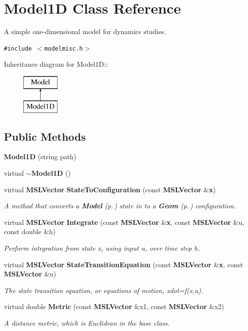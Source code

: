 \section{Model1D  Class Reference}
\label{classModel1D}
A simple one-dimensional model for dynamics studies. 


{\tt \#include $<$modelmisc.h$>$}

Inheritance diagram for Model1D::\begin{figure}[H]
\begin{center}
\leavevmode
\includegraphics[height=2cm]{classModel1D}
\end{center}
\end{figure}
\subsection*{Public Methods}
\begin{CompactItemize}
\item 
{\bf Model1D} (string path)
\item 
virtual {\bf $\sim$Model1D} ()
\item 
virtual {\bf MSLVector} {\bf State\-To\-Configuration} (const {\bf MSLVector} \&{\bf x})
\begin{CompactList}\small\item\em A method that converts a {\bf Model} {\rm (p.\,\pageref{classModel})} state in to a {\bf Geom} {\rm (p.\,\pageref{classGeom})} configuration.\item\end{CompactList}\item 
virtual {\bf MSLVector} {\bf Integrate} (const {\bf MSLVector} \&{\bf x}, const {\bf MSLVector} \&u, const double \&h)
\begin{CompactList}\small\item\em Perform integration from state x, using input u, over time step h.\item\end{CompactList}\item 
virtual {\bf MSLVector} {\bf State\-Transition\-Equation} (const {\bf MSLVector} \&{\bf x}, const {\bf MSLVector} \&u)
\begin{CompactList}\small\item\em The state transition equation, or equations of motion, xdot=f(x,u).\item\end{CompactList}\item 
virtual double {\bf Metric} (const {\bf MSLVector} \&x1, const {\bf MSLVector} \&x2)
\begin{CompactList}\small\item\em A distance metric, which is Euclidean in the base class.\item\end{CompactList}\end{CompactItemize}
